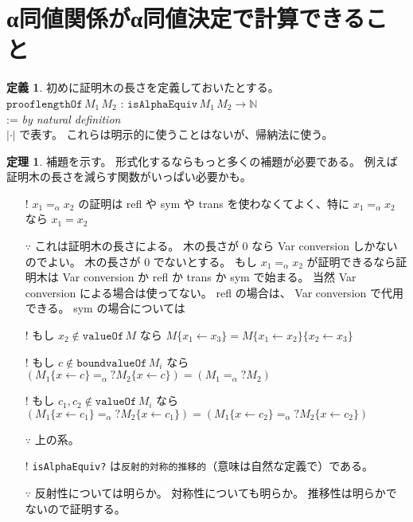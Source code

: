 \documentclass[dvipdfmx]{jsarticle}
\theoremstyle{definition}
\newtheorem*{definition}{定義}
\newtheorem*{theorem}{定理}
\begin{document}
\section*{α同値関係がα同値決定で計算できること}
\begin{definition}
  初めに証明木の長さを定義しておいたとする。 \\
  \(\texttt{prooflengthOf} \, M_1 \, M_2\) : \(\texttt{isAlphaEquiv} \, M_1 \, M_2 \to \mathbb{N}\) \\
  := \textit{by natural definition} \\
  \(| \cdot |\) で表す。
  これらは明示的に使うことはないが、帰納法に使う。
\end{definition}

\begin{theorem}
  補題を示す。
  形式化するならもっと多くの補題が必要である。
  例えば証明木の長さを減らす関数がいっぱい必要かも。
  \begin{itemize}
    \item[!]
      \(x_1 =_{\alpha} x_2\) の証明は refl や sym や trans を使わなくてよく、特に \(x_1 =_{\alpha} x_2\) なら \(x_1 = x_2\)
    \item[\(\because\)]
      これは証明木の長さによる。
      木の長さが \(0\) なら Var conversion しかないのでよい。
      木の長さが \(0\) でないとする。
      もし \(x_1 =_{\alpha} x_2\) が証明できるなら証明木は Var conversion か refl か trans か sym で始まる。
      当然 Var conversion による場合は使ってない。
      refl の場合は、 Var conversion で代用できる。
      sym の場合については
    \item[!]
      もし \(x_2 \notin \texttt{valueOf} \, M\) なら \(M\{x_1 \leftarrow x_3\} = M\{x_1 \leftarrow x_2\}\{x_2 \leftarrow x_3\}\)
    \item[!]
      もし \(c \notin \texttt{boundvalueOf} \, M_i\) なら \((M_1 \{x \leftarrow c\} =_{\alpha}? M_2\{x \leftarrow c\}) = (M_1 =_{\alpha}? M_2)\)
    \item[!]
      もし \(c_1 , c_2 \notin \texttt{valueOf} \, M_i\) なら \((M_1\{x \leftarrow c_1\} =_{\alpha}? M_2\{x \leftarrow c_1\}) = (M_1\{x \leftarrow c_2\} =_{\alpha}? M_2\{x \leftarrow c_2\})\)
    \item[\(\because\)]
      上の系。
    \item[!]
      \texttt{isAlphaEquiv?} は\texttt{反射的対称的推移的}（意味は自然な定義で）である。
    \item[\(\because\)]
      反射性については明らか。
      対称性についても明らか。
      推移性は明らかでないので証明する。

\end{itemize}
\end{theorem}
\end{document}
